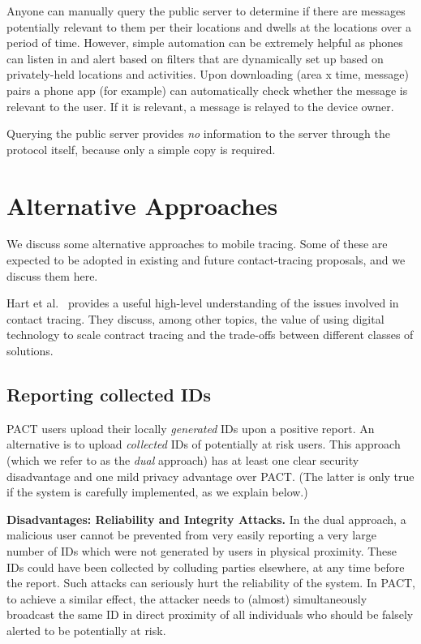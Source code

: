 Anyone can manually query the public server to determine if there are messages potentially relevant to them per their locations and dwells at the locations over a period of time. However, simple automation can be extremely helpful as phones can listen in and alert based on filters that are dynamically set up based on privately-held locations and activities. Upon downloading (area x time, message) pairs a phone app (for example) can automatically check whether the message is relevant to the user.  If it is relevant, a message is relayed to the device owner.

Querying the public server provides \emph{no} information to the server through the protocol itself, because only a simple copy is required.  


\section{Alternative Approaches}\label{sec:alt}

We discuss some alternative approaches to mobile tracing. Some of these are expected to be adopted in existing and future contact-tracing proposals, and we discuss them here. 

Hart et al.~\cite{vihart} provides a useful high-level understanding of the issues involved in contact tracing. They discuss, among other topics, the value of using digital technology to scale contract tracing and the trade-offs between different classes of solutions.

\subsection{Reporting collected IDs}
\label{sec:dual}

PACT users upload their locally {\em generated} IDs upon a positive report. An alternative is to upload {\em collected} IDs of potentially at risk users. This approach (which we refer to as the {\em dual} approach) has at least one clear security disadvantage and one mild privacy advantage over PACT. (The latter is only true if the system is carefully implemented, as we explain below.)

{\bf Disadvantages: Reliability and Integrity Attacks.} In the dual approach, a malicious user cannot be prevented from very easily reporting a very large number of IDs which were not generated by users in physical proximity. These IDs could have been collected by colluding parties elsewhere, at any time before the report. Such attacks can seriously hurt the reliability of the system. In PACT, to achieve a similar effect, the attacker needs to (almost) simultaneously broadcast the same ID in direct proximity of all individuals who should be falsely alerted to be potentially at risk. 

